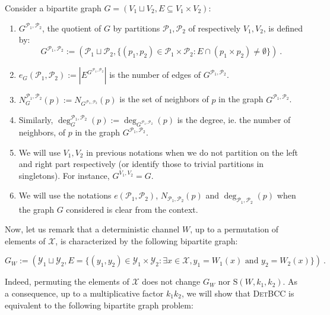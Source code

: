 \begin{defi}
  Consider a bipartite graph $G = (V_1 \sqcup V_2, E \subseteq V_1 \times V_2)$:
  \begin{enumerate}
    \item $G^{\mathcal{P}_1,\mathcal{P}_2}$, the quotient of $G$ by partitions $\mathcal{P}_1,\mathcal{P}_2$ of respectively $V_1,V_2$, is defined by:
      \[ G^{\mathcal{P}_1,\mathcal{P}_2} := \left(\mathcal{P}_1 \sqcup \mathcal{P}_2, \{(p_1,p_2) \in \mathcal{P}_1 \times \mathcal{P}_2: E \cap (p_1 \times p_2) \not= \emptyset\}\right) \ .\]
    \item $e_G(\mathcal{P}_1,\mathcal{P}_2) := |E^{G^{\mathcal{P}_1,\mathcal{P}_2}}|$ is the number of edges of $G^{\mathcal{P}_1,\mathcal{P}_2}$.
    \item $N_G^{\mathcal{P}_1,\mathcal{P}_2}(p) := N_{G^{\mathcal{P}_1,\mathcal{P}_2}}(p)$ is the set of neighbors of $p$ in the graph $G^{\mathcal{P}_1,\mathcal{P}_2}$.
    \item Similarly, $\deg_G^{\mathcal{P}_1,\mathcal{P}_2}(p) := \deg_{G^{\mathcal{P}_1,\mathcal{P}_2}}(p)$ is the degree, ie. the number of neighbors, of $p$ in the graph $G^{\mathcal{P}_1,\mathcal{P}_2}$.
    \item We will use $V_1,V_2$ in previous notations when we do not partition on the left and right part respectively (or identify those to trivial partitions in singletons). For instance, $G^{V_1,V_2}=G$.
    \item We will use the notations $e(\mathcal{P}_1,\mathcal{P}_2)$, $N_{\mathcal{P}_1,\mathcal{P}_2}(p)$  and $\deg_{\mathcal{P}_1,\mathcal{P}_2}(p)$ when the graph $G$ considered is clear from the context.
  \end{enumerate}
\end{defi}

Now, let us remark that a deterministic channel $W$, up to a permutation of elements of $\mathcal{X}$, is characterized by the following bipartite graph:

\begin{defi}
\[ G_W:=(\mathcal{Y}_1 \sqcup \mathcal{Y}_2, E = \{(y_1,y_2) \in \mathcal{Y}_1 \times \mathcal{Y}_2: \exists x \in \mathcal{X}, y_1=W_1(x) \text{ and } y_2=W_2(x)\}) \ . \]
\end{defi}

Indeed, permuting the elements of $\mathcal{X}$ does not change $G_W$ nor $\mathrm{S}(W,k_1,k_2)$. As a consequence, up to a multiplicative factor $k_1k_2$, we will show that \textsc{DetBCC} is equivalent to the following bipartite graph problem:

